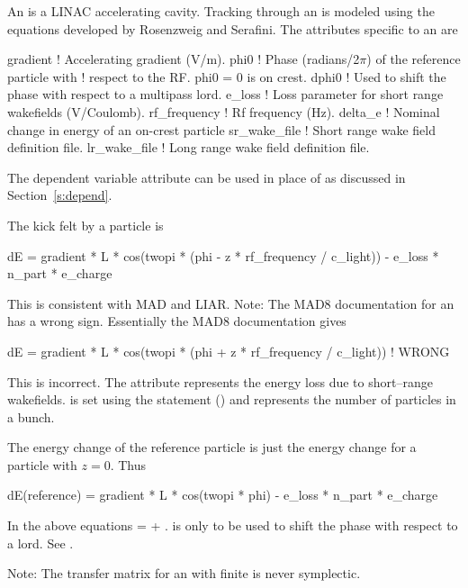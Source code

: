 {{An  is a LINAC accelerating cavity.
Tracking through an  is modeled using the equations
developed by Rosenzweig and Serafini\cite{b:rosenzweig}. The
attributes specific to an  are 
\begin{example}
  gradient     ! Accelerating gradient (V/m).
  phi0         ! Phase (radians/2\(\pi\)) of the reference particle with 
               !   respect to the RF. phi0 = 0 is on crest.
  dphi0        ! Used to shift the phase with respect to a multipass lord.
  e_loss       ! Loss parameter for short range wakefields (V/Coulomb).
  rf_frequency ! Rf frequency (Hz).
  delta_e      ! Nominal change in energy of an on-crest particle
  sr_wake_file ! Short range wake field definition file.
  lr_wake_file ! Long range wake field definition file.
\end{example}
The dependent variable  attribute can be used in place of
 as discussed in Section~\ref{s:depend}.

The kick felt by a particle is 
\begin{example}
  dE = gradient * L * cos(twopi * (phi - z * rf_frequency / c_light)) - 
                                                   e_loss * n_part * e_charge 
\end{example}
This is consistent with MAD and LIAR. Note: The MAD8 documentation 
for an  has a wrong sign. Essentially the MAD8 documentation gives
\begin{example}
  dE = gradient * L * cos(twopi * (phi + z * rf_frequency / c_light)) ! WRONG
\end{example}
This is incorrect. The  attribute represents the energy loss due to 
short--range wakefields.  is set using the  statement 
() and represents the number of particles in a bunch. 

The energy change of the reference particle is just the energy change for a 
particle with $z = 0$. Thus
\begin{example}
  dE(reference) = gradient * L * cos(twopi * phi) - e_loss * n_part * e_charge
\end{example}

In the above equations  =  + . 
is only to be used to shift the phase with respect to a 
lord. See .

Note: The transfer matrix for an  with finite
 is never symplectic.

}}
